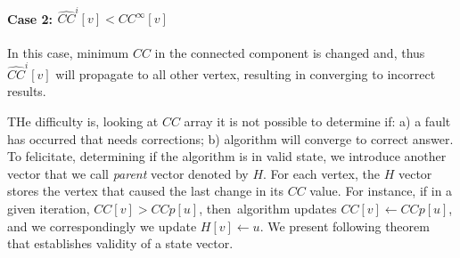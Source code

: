 \paragraph{Case 2: $\hat{CC}^{i}[v] < CC^{\infty}[v]$} 
In this case, minimum $CC$ in the connected component is changed and, thus $\hat{CC}^{i}[v]$ will propagate to all other vertex, resulting in converging to incorrect results.

THe difficulty is, looking at $CC$ array it is not possible to determine if: a) a fault has occurred that needs corrections; b) algorithm will converge to correct answer. To felicitate, determining if the algorithm is in valid state, we introduce another vector that we call \emph{parent} vector denoted by $H$. 
For each vertex, the $H$ vector stores the vertex that caused the last change in its $CC$ value.
For instance, if in a given iteration, $CC[v]>CCp[u]$, then~\sv algorithm updates $CC[v]\leftarrow CCp[u]$, 
and we correspondingly we update $H[v]\leftarrow u$.
We present following theorem that establishes validity of a state vector. 


\begin{comment}
\begin{thm}
\label{thm:strong-SV-converg-cond}
Given a graph $G=(V,E)$ and a arbitrary state vector $S=(CC,H)$, the~\refalg{alg:SV_ALG} starting from $S$ will converge to correct solution defined by [insert ref to definition], if $S$ satisfies following condition:
%
\begin{enumerate*}
\item Parent of any vertex $v$ is either $v$ itself or it is one of neighbor: $H(v) \in \{ v, E(v)\}$;

\item if $H(v)=v$, then $CC(v)=v$;

\item $CC[v]\leq v$;

\item $CC[v]\geq CC[H[v]] $ ;and

\item There are no loop except self-loops in the directed graph $G^{*}$ defined by $G^{*} = (V,E^{*})$,
 where $E^{*}=\{ (v,H(v)) \forall v \in V \}$ .
\end{enumerate*}
\end{thm}
\end{comment}




